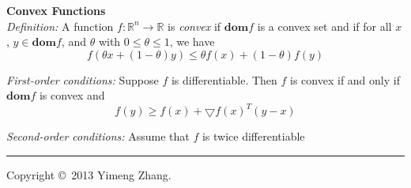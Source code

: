 \documentclass[10pt,landscape]{article}
\begin{document}
\begin{multicols}{3}
\textbf{Convex Functions} \\
\emph{Definition:} A function $f: \mathbb{R}^n \to \mathbb{R}$ is \emph{convex} if $\mathbf{dom} f$ is a convex set and if for all $x$, $y \in \mathbf{dom} f$, and $\theta$ with $0 \leq \theta \leq 1$, we have \\
$$ f(\theta x + (1 - \theta) y) \leq \theta f(x) + (1 - \theta) f(y) $$

\emph{First-order conditions:} Suppose $f$ is differentiable. Then $f$ is convex if and only if $\mathbf{dom} f$ is convex and
$$ f(y) \geq f(x) + \bigtriangledown f(x)^T (y-x) $$

\emph{Second-order conditions:} Assume that $f$ is twice differentiable


\rule{0.3\linewidth}{0.25pt}
\scriptsize

Copyright \copyright\ 2013 Yimeng Zhang.

\end{multicols}
\end{document}
